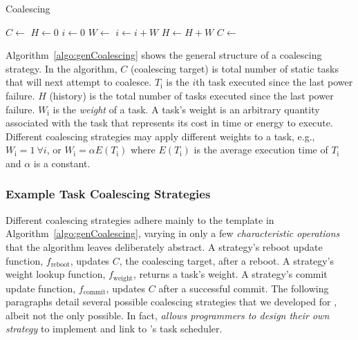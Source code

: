 \begin{algorithm}[t]
	\caption{Coalescing}
	\label{algo:genCoalescing}
	\scriptsize
	\begin{algorithmic}[1]
        \State $C \leftarrow $  
        \State $H \gets 0$ 
	        \State $ i \gets 0$
		        \State {}
		        \State $W \leftarrow $  
		        \State $i \gets i + W$
				\State $H \gets H + W$
	        \EndWhile
	        \State {}
	        \State $C \leftarrow $ 
        \EndWhile
	\end{algorithmic}
\end{algorithm}

Algorithm~\ref{algo:genCoalescing} shows the general structure of a coalescing strategy. In the algorithm, $C$ (coalescing target) is total number of static tasks that \sys will next attempt to coalesce. $T_\text{i}$ is the $i$th task executed since the last power failure. $H$ (history) is the total number of tasks executed since the last power failure. $W_\text{i}$ is the {\em weight} of a task. A task's weight is an arbitrary quantity associated with the task that represents its cost in time or energy to execute. Different coalescing strategies may apply different weights to a task, e.g., $W_\text{i} = 1\ \forall i$, or $W_\text{i} = \alpha E(T_\text{i})$ where $E(T_\text{i})$ is the average execution time of $T_\text{i}$ and $\alpha$ is a constant.

\subsubsection{Example Task Coalescing Strategies}
\label{subsec:coalescingStrategies}

Different coalescing strategies adhere mainly to the template in Algorithm~\ref{algo:genCoalescing}, varying in only a few {\em characteristic operations} that the algorithm leaves deliberately abstract. A strategy's reboot update function, $f_\text{reboot}$, updates $C$, the coalescing target, after a reboot. A strategy's weight lookup function, $f_\text{weight}$, returns a task's weight.  A strategy's commit update function, $f_\text{commit}$, updates $C$ after a successful commit. The following paragraphs detail several possible coalescing strategies that we developed for \sys, albeit not the only possible. In fact, \sys \emph{allows programmers to design their own strategy} to implement and link to \sys's task scheduler. 

